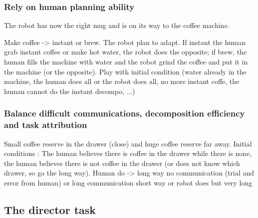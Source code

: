 \documentclass[a4paper,11pt,twoside]{StyleThese}
\begin{document}
\subsubsection{Rely on human planning ability}
The robot has now the right mug and is on its way to the coffee machine. 

Make coffee -> instant or brew. The robot plan to adapt. If instant the human grab instant coffee or make hot water, the robot does the opposite; if brew, the human fills the machine with water and the robot grind the coffee and put it in the machine (or the opposite). Play with initial condition (water already in the machine, the human does all or the robot does all, no more instant coffe, the human cannot do the instant decompo, ...)

\subsubsection{Balance difficult communications, decomposition efficiency and task attribution}

Small coffee reserve in the drawer (close) and huge coffee reserve far away. Initial conditions : The human believes there is coffee in the drawer while there is none, the human believes there is not coffee in the drawer (or does not know which drawer, so go the long way).  
Human do -> long way no communication (trial and error from human) or long communication short way or robot does but very long


\subsection{The director task}

\ifdefined{}
\else


\end{document}

